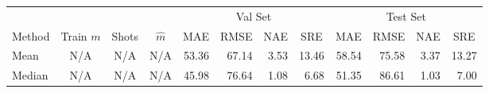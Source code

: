 
\begin{tabular}{lcccrrrrrrrr}
 \toprule
 & & &  & \multicolumn{4}{c}{Val Set} & \multicolumn{4}{c}{Test Set} \\
 \cmidrule(r){5-8} \cmidrule(r){9-12}

\multicolumn{1}{c}{Method} & \multicolumn{1}{c}{Train $m$} & \multicolumn{1}{c}{Shots} & \multicolumn{1}{c}{$\hat{m}$} & \multicolumn{1}{c}{MAE} & \multicolumn{1}{c}{RMSE} & \multicolumn{1}{c}{NAE} & \multicolumn{1}{c}{SRE} & \multicolumn{1}{c}{MAE} & \multicolumn{1}{c}{RMSE} & \multicolumn{1}{c}{NAE} & \multicolumn{1}{c}{SRE} \\

\midrule
Mean  & N/A &  N/A  & N/A  & 
53.36 & 67.14 & 3.53 & 13.46 & 58.54 & 75.58 & 3.37 & 13.27\\
Median & N/A & N/A & N/A  &
45.98 & 76.64 & 1.08 & 6.68 &
51.35 & 86.61 & 1.03 & 7.00\\





\end{tabular}
